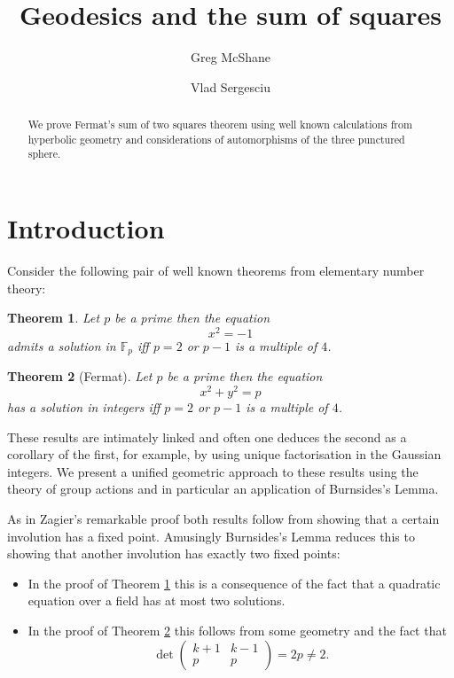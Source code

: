 \documentclass[12pt,a4paper]{amsart}
\title{Geodesics and the sum of squares}
\author[McShane]{Greg McShane}
\author[Vlad]{Vlad Sergesciu}
\newtheorem{thm}{Theorem}[section]
\def\fp{\mathbb{F}_p}
\begin{document}
\maketitle

\begin{abstract} 
We prove Fermat's sum  of two squares theorem 
using well known calculations from hyperbolic geometry 
and considerations of automorphisms of the three punctured sphere.
\end{abstract} 


\section{Introduction}

Consider the following pair of well known theorems from elementary number theory:


\begin{thm}\label{triv}
Let $p$ be a prime then the equation
$$x^2 = -1$$
admits a solution in $\fp$ iff 
$p =2$ or $p-1$ is a multiple of $4$.
\end{thm}


\begin{thm}[Fermat]\label{main}
Let $p$ be a prime then the equation
$$x^2 + y^2 = p $$
has a solution in integers  iff  $p =2$ or $p-1$ is a multiple of $4$.
\end{thm}

These results are intimately linked and often one deduces the second as a corollary of the first,
 for example, by using unique factorisation in the Gaussian integers.  We present a unified geometric  approach to these results  using the theory of group actions and in particular an application of Burnsides's Lemma. 
 
 
As in Zagier's remarkable proof \cite{zagier} both results follow from showing that a certain involution has a fixed point. Amusingly Burnsides's Lemma reduces this to showing that another involution has exactly two fixed points:
\begin{itemize}
\item  In the proof of Theorem \ref{triv} this is a consequence of the fact that a quadratic equation 
over a field has at most two solutions.
\item In the proof of Theorem \ref{main} this follows from some geometry and the fact that 
$$ \det 
\begin{pmatrix}
k + 1 & k- 1\\
p & p 
\end{pmatrix} = 2p \neq 2.
$$
 \end{itemize}
\end{document}
